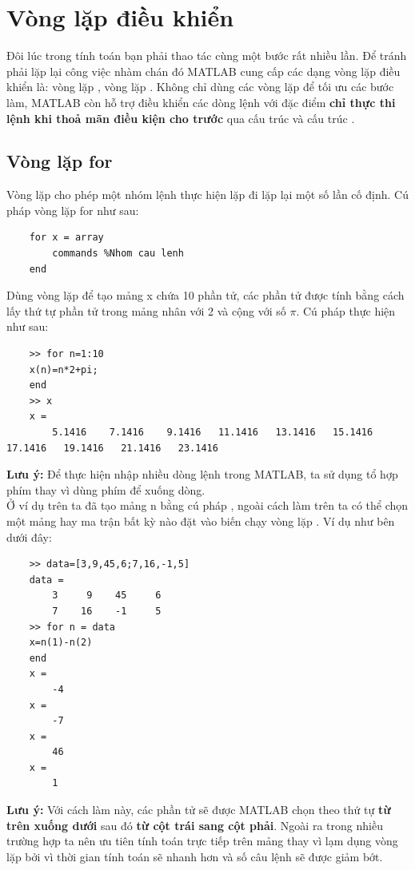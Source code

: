 \documentclass[12pt,a4paper]{article}
\begin{document}
\section{Vòng lặp điều khiển}
Đôi lúc trong tính toán bạn phải thao tác cùng một bước rất nhiều lần. Để tránh phải lặp lại công việc nhàm chán đó MATLAB cung cấp các dạng vòng lặp điều khiển là: vòng lặp , vòng lặp . Không chỉ dùng các vòng lặp để tối ưu các bước làm, MATLAB còn hỗ trợ điều khiển các dòng lệnh với đặc điểm \textbf{chỉ thực thi lệnh khi thoả mãn điều kiện cho trước} qua cấu trúc  và cấu trúc .
\subsection{Vòng lặp for}
Vòng lặp  cho phép một nhóm lệnh thực hiện lặp đi lặp lại một số lần cố định. Cú pháp vòng lặp for như sau:
\begin{lstlisting}
	for x = array
		commands %Nhom cau lenh
	end
\end{lstlisting}
\begin{example}
Dùng vòng lặp  để tạo mảng x chứa 10 phần tử, các phần tử được tính bằng cách lấy thứ tự phần tử trong mảng nhân với 2 và cộng với số $\pi$. Cú pháp thực hiện như sau:
\begin{lstlisting}
	>> for n=1:10
	x(n)=n*2+pi;
	end
	>> x
	x =
    	5.1416    7.1416    9.1416   11.1416   13.1416   15.1416   17.1416   19.1416   21.1416   23.1416
\end{lstlisting}
\end{example}
\textbf{Lưu ý:} Để thực hiện nhập nhiều dòng lệnh trong MATLAB, ta sử dụng tổ hợp phím  thay vì dùng phím  để xuống dòng.\\
Ở ví dụ trên ta đã tạo mảng n bằng cú pháp , ngoài cách làm trên ta có thể chọn một mảng hay ma trận bất kỳ nào đặt vào biến chạy vòng lặp . Ví dụ như bên dưới đây:
\begin{lstlisting}
	>> data=[3,9,45,6;7,16,-1,5]
	data =
     	3     9    45     6
     	7    16    -1     5
	>> for n = data
	x=n(1)-n(2)
	end
	x =
    	-4
	x =
    	-7
	x =
    	46
	x =
     	1
\end{lstlisting}
\textbf{Lưu ý:} Với cách làm này, các phần tử sẽ được MATLAB chọn theo thứ tự \textbf{từ trên xuống dưới} sau đó \textbf{từ cột trái sang cột phải}. Ngoài ra trong nhiều trường hợp ta nên ưu tiên tính toán trực tiếp trên mảng thay vì lạm dụng vòng lặp  bởi vì thời gian tính toán sẽ nhanh hơn và số câu lệnh sẽ được giảm bớt.
\end{document}
